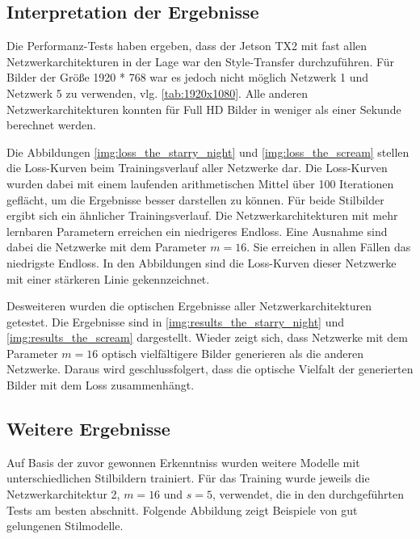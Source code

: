 \subsection{Interpretation der Ergebnisse}

Die Performanz-Tests haben ergeben, dass der Jetson TX2 mit fast allen Netzwerkarchitekturen in der Lage war den Style-Transfer durchzuführen. Für Bilder der Größe 1920 * 768  war es jedoch nicht möglich Netzwerk 1 und Netzwerk 5 zu verwenden, vlg. \ref{tab:1920x1080}. Alle anderen Netzwerkarchitekturen konnten für Full HD Bilder in weniger als einer Sekunde berechnet werden.

Die Abbildungen \ref{img:loss_the_starry_night} und \ref{img:loss_the_scream} stellen die Loss-Kurven beim Trainingsverlauf aller Netzwerke dar. Die Loss-Kurven wurden dabei mit einem laufenden arithmetischen Mittel über 100 Iterationen geflächt, um die Ergebnisse besser darstellen zu können. Für beide Stilbilder ergibt sich ein ähnlicher Trainingsverlauf. Die Netzwerkarchitekturen mit mehr lernbaren Parametern erreichen ein niedrigeres Endloss. Eine Ausnahme sind dabei die Netzwerke mit dem Parameter $ m = 16 $. Sie erreichen in allen Fällen das niedrigste Endloss. In den Abbildungen sind die Loss-Kurven dieser Netzwerke mit einer stärkeren Linie gekennzeichnet.

Desweiteren wurden die optischen Ergebnisse aller Netzwerkarchitekturen getestet. Die Ergebnisse sind in \ref{img:results_the_starry_night} und \ref{img:results_the_scream} dargestellt. Wieder zeigt sich, dass Netzwerke mit dem Parameter $ m = 16 $ optisch vielfältigere Bilder generieren als die anderen Netzwerke. Daraus wird geschlussfolgert, dass die optische Vielfalt der generierten Bilder mit dem Loss zusammenhängt.

\subsection{Weitere Ergebnisse}

Auf Basis der zuvor gewonnen Erkenntniss wurden weitere Modelle mit unterschiedlichen Stilbildern trainiert. Für das Training wurde jeweils die Netzwerkarchitektur 2, $ m = 16 $ und $ s = 5 $, verwendet, die in den durchgeführten Tests am besten abschnitt. Folgende Abbildung zeigt Beispiele von gut gelungenen Stilmodelle.

